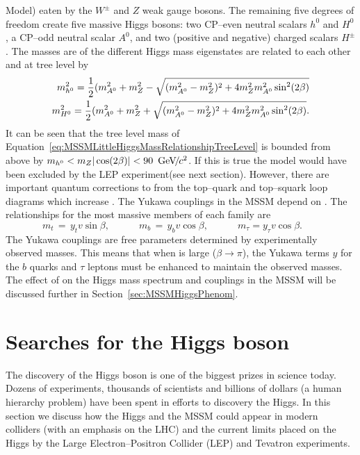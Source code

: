 Model) eaten by the $W^\pm$ and $Z$ weak gauge bosons.  The remaining five
degrees of freedom create five massive Higgs bosons: two CP--even neutral
scalars $h^0$ and $H^0$, a CP--odd neutral scalar $A^0$, and two (positive and
negative) charged scalars $H^\pm$.  The masses are of the different Higgs mass
eigenstates are related to each other and \tanb at tree level by
\begin{eqnarray}
  m_{h^0}^2 = \frac{1}{2}(m_{A^0}^2 + m_Z^2 - \sqrt{
  (m_{A^0}^2 - m_Z^2)^2 + 4m_Z^2m_{A^0}^2\sin^2(2\beta)} 
  \label{eq:MSSMLittleHiggsMassRelationshipTreeLevel} \\
  m_{H^0}^2 = \frac{1}{2}(m_{A^0}^2 + m_Z^2 + \sqrt{
  (m_{A^0}^2 - m_Z^2)^2 + 4m_Z^2m_{A^0}^2\sin^2(2\beta)}. 
  \nonumber
\end{eqnarray}
It can be seen that the tree level mass \mhZero of
Equation~\ref{eq:MSSMLittleHiggsMassRelationshipTreeLevel} is bounded from above
by $m_{h^0} < m_Z|\cos(2\beta)| < 90~{\,\text{Ge\hspace{-.08em}V\hspace{-0.16em}/\hspace{-0.08em}}c^\text{2}}$.  If this is true the model would
have been excluded by the LEP experiment(see next section).  However, there are
important quantum corrections to \mhZero from the top--quark and top--squark
loop diagrams which increase \mhZero.  The Yukawa couplings in the MSSM depend
on \tanb.  The relationships for the most massive members of each family are
\begin{equation}
  m_t \,=\, y_t v \sin\beta
  ,
  \qquad\quad
  m_b \,=\, y_b v \cos\beta
  ,
  \qquad\quad
  m_\tau = y_\tau v \cos\beta.\phantom{xxx}
  \nonumber
\end{equation}
The Yukawa couplings are free parameters determined by experimentally observed
masses.  This means that when \tanb is large ($\beta \to \pi$), the Yukawa terms
$y$ for the $b$ quarks and $\tau$ leptons must be enhanced to maintain the
observed masses.  The effect of \tanb on the Higgs mass spectrum and couplings
in the MSSM will be discussed further in Section~\ref{sec:MSSMHiggsPhenom}.
%
\section{Searches for the Higgs boson}
\label{sec:PreviousSearches} The discovery of the Higgs boson is one of the
biggest prizes in science today.  Dozens of experiments, thousands of scientists
and billions of dollars (a human hierarchy problem) have been spent in efforts
to discovery the Higgs.  In this section we discuss how the Higgs and the MSSM
could appear in modern colliders (with an emphasis on the LHC) and the current
limits placed on the Higgs by the Large Electron--Positron Collider (LEP) and
Tevatron experiments.  
%
